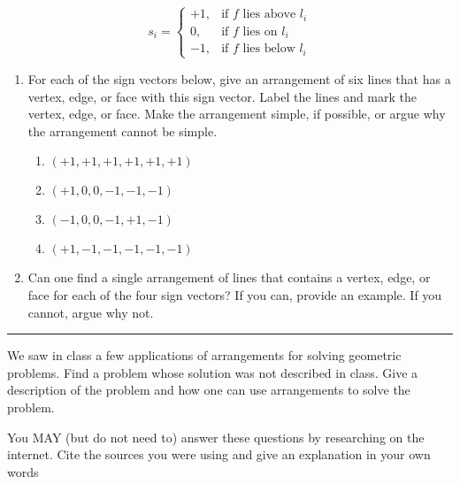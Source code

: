 \documentclass[11pt]{article}
\begin{document}
$$
    s_i =
    \begin{cases}
        +1, & \text{if $f$ lies above $l_i$} \\
        0,  & \text{if $f$ lies on $l_i$} \\
        -1, & \text{if $f$ lies below $l_i$}
    \end{cases}
$$

\begin{enumerate}

    \item For each of the sign vectors below, give an arrangement of six lines
        that has a vertex, edge, or face with this sign vector. Label the lines
        and mark the vertex, edge, or face. Make the arrangement simple, if
        possible, or argue why the arrangement cannot be simple.
        \begin{enumerate}
            \item $(+1, +1, +1, +1, +1, +1)$
            \item $(+1, 0, 0, -1, -1, -1)$
            \item $(-1, 0, 0, -1, +1, -1)$
            \item $(+1, -1, -1, -1, -1, -1)$
        \end{enumerate}

    \item Can one find a single arrangement of lines that contains a vertex,
        edge, or face for each of the four sign vectors? If you can, provide an
        example.  If you cannot, argue why not.

\end{enumerate}

\hrule












We saw in class a few applications of arrangements for solving geometric
problems. Find a problem whose solution was not described in class.  Give a
description of the problem and how one can use arrangements to solve the
problem.

You MAY (but do not need to) answer these questions by researching on the
internet. Cite the sources you were using and give an explanation in your own
words
\end{document}
